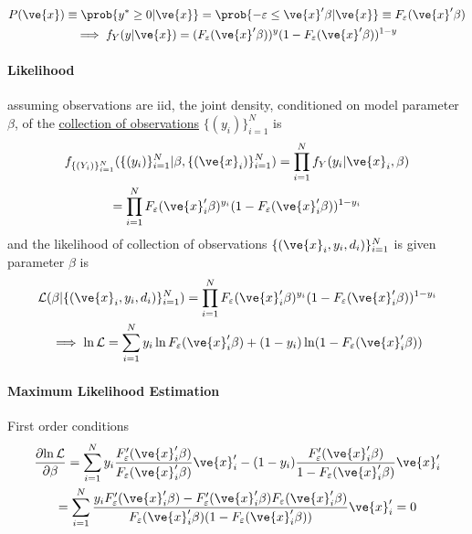 \documentclass[11pt]{article}
\begin{document}
					\begin{gather}
						P(\ve{x}) \equiv \prob{y^* \geq 0|\ve{x}} = \prob{-\varepsilon \leq \ve{x}' \beta | \ve{x}} \equiv F_{\varepsilon}(\ve{x}'\beta) \\
						\implies f_Y(y|\ve{x}) = (F_{\varepsilon}(\ve{x}'\beta))^y (1 - F_{\varepsilon}(\ve{x}'\beta))^{1-y}
					\end{gather}
					
				\paragraph{Likelihood} assuming observations are iid, the joint density, conditioned on model parameter $\beta$, of the \ul{collection of observations} $\{(y_i)\}_{i=1}^N$ is
					\begin{gather}
						f_{\{(Y_i)\}_{i=1}^N}(\{(y_i)\}_{i=1}^N|\beta, \{(\ve{x}_i)\}_{i=1}^N) = \prod_{i=1}^N f_Y(y_i|\ve{x}_i, \beta) \\
						= \prod_{i=1}^N F_\varepsilon(\ve{x}_i' \beta)^{y_i} (1 - F_\varepsilon(\ve{x}_i' \beta))^{1 - y_i}
					\end{gather}
					and the likelihood of collection of observations $\{(\ve{x}_i, y_i, d_i)\}_{i=1}^N$ is given parameter $\beta$ is 
					\begin{gather}
						\mc{L}(\beta|\{(\ve{x}_i, y_i, d_i)\}_{i=1}^N) = \prod_{i=1}^N F_\varepsilon(\ve{x}_i' \beta)^{y_i} (1 - F_\varepsilon(\ve{x}_i' \beta))^{1 - y_i} \\
						\implies \ln \mc{L} = \sum_{i=1}^N y_i \ln F_\varepsilon(\ve{x}_i' \beta) + (1 - y_i) \ln (1 - F_\varepsilon(\ve{x}_i' \beta))
					\end{gather}
					
				\paragraph{Maximum Likelihood Estimation} First order conditions
					\begin{gather}
						\pd{\ln \mc{L}}{\beta} = \sum_{i=1}^N y_i \frac{F'_\varepsilon(\ve{x}_i' \beta)}{F_\varepsilon(\ve{x}_i' \beta)} \ve{x}'_i 
						- (1 - y_i) \frac{F'_\varepsilon(\ve{x}_i' \beta)}{1 - F_\varepsilon(\ve{x}_i' \beta)}\ve{x}'_i \\
						= \sum_{i=1}^N \frac{y_i F'_\varepsilon(\ve{x}_i' \beta) - F'_\varepsilon(\ve{x}_i' \beta)F_\varepsilon(\ve{x}_i' \beta)}{F_\varepsilon(\ve{x}_i' \beta)(1-F_\varepsilon(\ve{x}_i' \beta))} \ve{x}'_i = 0
					\end{gather}
					
\end{document}
